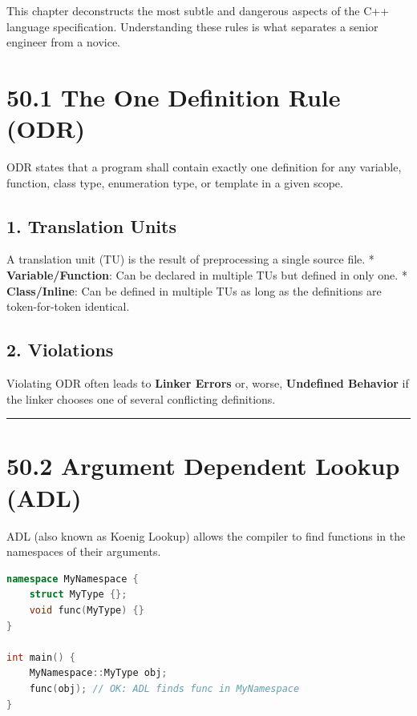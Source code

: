 This chapter deconstructs the most subtle and dangerous aspects of the
C++ language specification. Understanding these rules is what separates
a senior engineer from a novice.

\hypertarget{the-one-definition-rule-odr}{%
\section{50.1 The One Definition Rule
(ODR)}\label{the-one-definition-rule-odr}}

ODR states that a program shall contain exactly one definition for any
variable, function, class type, enumeration type, or template in a given
scope.

\hypertarget{translation-units}{%
\subsection{1. Translation Units}\label{translation-units}}

A translation unit (TU) is the result of preprocessing a single source
file. * \textbf{Variable/Function}: Can be declared in multiple TUs but
defined in only one. * \textbf{Class/Inline}: Can be defined in multiple
TUs as long as the definitions are token-for-token identical.

\hypertarget{violations}{%
\subsection{2. Violations}\label{violations}}

Violating ODR often leads to \textbf{Linker Errors} or, worse,
\textbf{Undefined Behavior} if the linker chooses one of several
conflicting definitions.

\begin{center}\rule{0.5\linewidth}{0.5pt}\end{center}

\hypertarget{argument-dependent-lookup-adl}{%
\section{50.2 Argument Dependent Lookup
(ADL)}\label{argument-dependent-lookup-adl}}

ADL (also known as Koenig Lookup) allows the compiler to find functions
in the namespaces of their arguments.

\begin{lstlisting}[language={C++}]
namespace MyNamespace {
    struct MyType {};
    void func(MyType) {}
}

int main() {
    MyNamespace::MyType obj;
    func(obj); // OK: ADL finds func in MyNamespace
}
\end{lstlisting}

